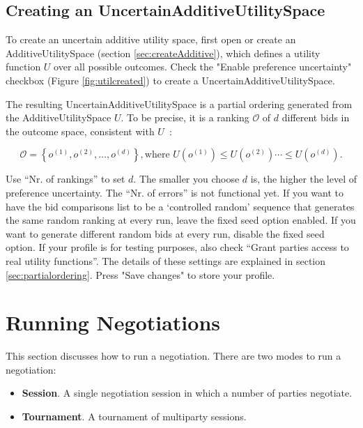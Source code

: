 \documentclass[]{article}
\begin{document}
\subsection{Creating an UncertainAdditiveUtilitySpace}

To create an uncertain additive utility space, first open or create an AdditiveUtilitySpace (section \ref{sec:createAdditive}), which defines a utility function $U$ over all possible outcomes. Check the "Enable preference uncertainty" checkbox  (Figure \ref{fig:utilcreated}) to create a UncertainAdditiveUtilitySpace.

The resulting UncertainAdditiveUtilitySpace is a partial ordering generated from the AdditiveUtilitySpace $U$. To be precise, it is a ranking $\mathcal{O}$ of $d$ different bids in the outcome space, consistent with $U$~\cite{Tsi18}:

\begin{equation} 
\mathcal{O}=\left\{o^{(1)},o^{(2)}, \dots, o^{(d)} \right\}, \textrm{where } U(o^{(1)}) \leq U(o^{(2)}) \cdots \leq U(o^{(d)}).
\end{equation}


Use ``Nr. of rankings'' to set $d$. The smaller you choose $d$ is, the higher the level of preference uncertainty. The ``Nr. of errors'' is not functional yet. If you want to have the bid comparisons list to be a `controlled random' sequence that generates the same random ranking at every run, leave the fixed seed option enabled. If you want to generate different random bids at every run, disable the fixed seed option. If your profile is for testing purposes, also check ``Grant parties access to real utility functions''. The details of these settings are explained in section \ref{sec:partialordering}. Press "Save changes" to store your profile.

\section{Running Negotiations}
This section discusses how to run a negotiation. There are two modes to run a negotiation:

\begin{itemize}
	\item \textbf{Session}. A single negotiation session in which a number of parties negotiate.
	\item \textbf{Tournament}. A tournament of multiparty sessions.
\end{itemize}
\end{document}
